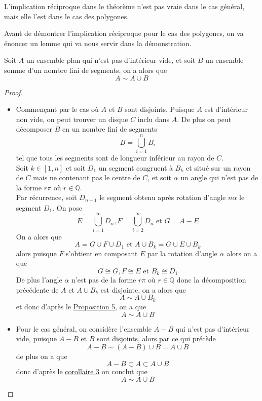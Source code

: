 \begin{rr}
  L'implication réciproque dans le théorème n'est pas vraie dans le cas général, mais elle l'est dans le cas des polygones.
\end{rr}
\noindent
Avant de démontrer l'implication réciproque pour le cas des polygones, on va énoncer un lemme qui va nous servir dans la démonstration.
\begin{lm}
Soit $A$ un ensemble plan qui n'est pas d'intérieur vide, et soit $B$ un ensemble somme d'un nombre fini de segments, on a alors que $$A \sim A \cup B$$
\end{lm}
\begin{proof}
  \hfill
  \begin{itemize}
    \item   Commençant par le cas où $A$ et $B$ sont disjoints. Puisque $A$ est d'intérieur non vide, on peut trouver un disque $C$ inclu dans $A$. De plus on peut décomposer $B$ en un nombre fini de segments $$B = \bigcup_{i=1}^n B_i$$
      tel que tous les segments sont de longueur inférieur au rayon de $C$.\\
      Soit $k \in [1,n]$ et soit $D_1$ un segment congruent à $B_k$ et situé sur un rayon de $C$ mais ne contenant pas le centre de $C$, et soit $\alpha$ un angle qui n'est pas de la forme $r\pi$ où $r\in \mathbb{Q}$.\\
      Par récurrence, soit $D_{n+1}$ le segment obtenu après rotation d'angle $n\alpha$ le segment $D_1$. On pose
      $$E = \bigcup_{i=1}^\infty D_n, F =  \bigcup_{i=2}^\infty D_n\text{ et } G = A-E$$
      On a alors que $$A = G \cup F \cup D_1 \text{ et } A \cup B_k = G \cup E \cup B_k$$
      alors puisque $F$ s'obtient en composant $E$ par la rotation d'angle $\alpha$ alors on a que $$G \cong G, F \cong E \text{ et } B_k \cong D_1$$
      De plus l'angle $\alpha$ n'est pas de la forme $r\pi$ où $r\in \mathbb{Q}$ donc la décomposition précédente de $A$ et $A \cup B_k$ est disjointe, on a alors que $$A \sim A \cup B_k$$
      et donc d'après le \hyperref[pr5]{Proposition 5}, on a que $$A \sim A \cup B$$
    \item Pour le cas général, on considère l'ensemble $A-B$ qui n'est pas d'intérieur vide, puisque $A-B$ et $B$ sont disjoints, alors par ce qui précède $$A-B \sim (A-B) \cup B = A \cup B$$
    de plus on a que $$A-B \subset A \subset A\cup B$$
    donc d'après le \hyperref[c2]{corollaire 3} on conclut que $$A \sim A \cup B$$
  \end{itemize}

\end{proof}
